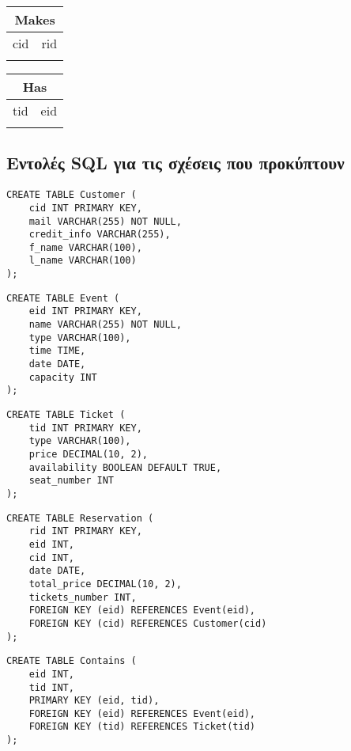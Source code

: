 \documentclass[a4paper, 11pt]{article}
\begin{document}
\vspace{5pt}

\noindent
\begin{tabular}{|c|c|}
\hline
\multicolumn{2}{|c|}{Makes} \\
\hline
cid & rid \\
\hline
& \\
\hline
\end{tabular}

\vspace{5pt}

\noindent
\begin{tabular}{|c|c|}
\hline
\multicolumn{2}{|c|}{Has} \\
\hline
tid & eid \\
\hline
& \\
\hline
\end{tabular}

\subsection*{Εντολές SQL για τις σχέσεις που προκύπτουν}
\begin{verbatim}
CREATE TABLE Customer (
    cid INT PRIMARY KEY,
    mail VARCHAR(255) NOT NULL,
    credit_info VARCHAR(255),
    f_name VARCHAR(100),
    l_name VARCHAR(100)
);
\end{verbatim}

\begin{verbatim}
CREATE TABLE Event (
    eid INT PRIMARY KEY,
    name VARCHAR(255) NOT NULL,
    type VARCHAR(100),
    time TIME,
    date DATE,
    capacity INT
);
\end{verbatim}

\begin{verbatim}
CREATE TABLE Ticket (
    tid INT PRIMARY KEY,
    type VARCHAR(100),
    price DECIMAL(10, 2),
    availability BOOLEAN DEFAULT TRUE,
    seat_number INT
);
\end{verbatim}

\begin{verbatim}
CREATE TABLE Reservation (
    rid INT PRIMARY KEY,
    eid INT,
    cid INT,
    date DATE,
    total_price DECIMAL(10, 2),
    tickets_number INT,
    FOREIGN KEY (eid) REFERENCES Event(eid),
    FOREIGN KEY (cid) REFERENCES Customer(cid)
);
\end{verbatim}

\begin{verbatim}
CREATE TABLE Contains (
    eid INT,
    tid INT,
    PRIMARY KEY (eid, tid),
    FOREIGN KEY (eid) REFERENCES Event(eid),
    FOREIGN KEY (tid) REFERENCES Ticket(tid)
);
\end{verbatim}
\end{document}

